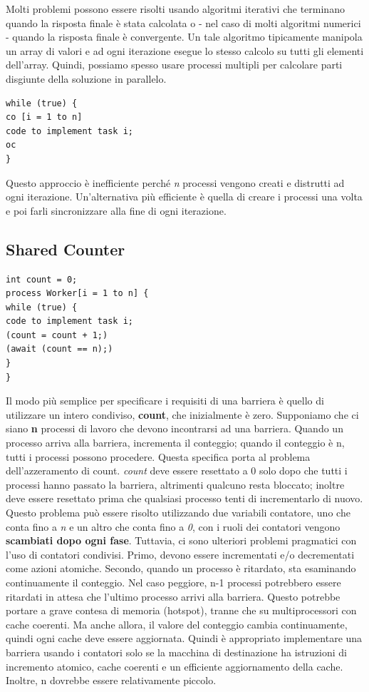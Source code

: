 \documentclass[10pt,a4paper]{book}
\begin{document}
Molti problemi possono essere risolti usando algoritmi iterativi che terminano quando la risposta finale è stata calcolata o - nel caso di molti algoritmi numerici - quando la risposta finale è convergente. Un tale algoritmo tipicamente manipola un array di valori e ad ogni iterazione esegue lo stesso calcolo su tutti gli elementi dell'array.
Quindi, possiamo spesso usare processi multipli per calcolare parti disgiunte della soluzione in parallelo. 
\begin{verbatim}
while (true) {
co [i = 1 to n]
code to implement task i;
oc
}
\end{verbatim} 
Questo approccio è inefficiente perché \textit{n} processi vengono creati e distrutti ad ogni iterazione.
Un'alternativa più efficiente è quella di creare i processi una volta e poi farli sincronizzare alla fine di ogni iterazione.

\subsection{Shared Counter}
\begin{verbatim}
int count = 0;
process Worker[i = 1 to n] {
while (true) {
code to implement task i;
(count = count + 1;)
(await (count == n);)
}
}
\end{verbatim}
Il modo più semplice per specificare i requisiti di una barriera è quello di utilizzare un intero condiviso, \textbf{count}, che inizialmente è zero. Supponiamo che ci siano \textbf{n} processi di lavoro che devono incontrarsi ad una barriera. Quando un processo arriva alla barriera, incrementa il conteggio; quando il conteggio è n, tutti i processi possono procedere. Questa specifica porta al problema dell'azzeramento di count. \textit{count} deve essere resettato a 0 solo dopo che tutti i processi hanno passato la barriera, altrimenti qualcuno resta bloccato; inoltre deve essere resettato prima che qualsiasi processo tenti di incrementarlo di nuovo.
Questo problema può essere risolto utilizzando due variabili contatore, uno
che conta fino a \textit{n} e un altro che conta fino a \textit{0}, con i ruoli dei contatori vengono \textbf{scambiati dopo ogni fase}. Tuttavia, ci sono ulteriori problemi pragmatici con l'uso di contatori condivisi. Primo, devono essere incrementati e/o decrementati come azioni atomiche. Secondo, quando un processo è ritardato, sta esaminando continuamente il conteggio. Nel caso peggiore, n-1 processi potrebbero essere ritardati in attesa che l'ultimo processo arrivi alla barriera. Questo potrebbe portare a grave contesa di memoria (hotspot), tranne che su multiprocessori con cache coerenti. Ma anche allora, il valore del conteggio cambia continuamente, quindi ogni cache deve essere aggiornata. Quindi è appropriato implementare una barriera usando i contatori solo se la macchina di destinazione ha istruzioni di incremento atomico, cache coerenti e un efficiente aggiornamento della cache. Inoltre, n dovrebbe essere relativamente piccolo.
\end{document}
